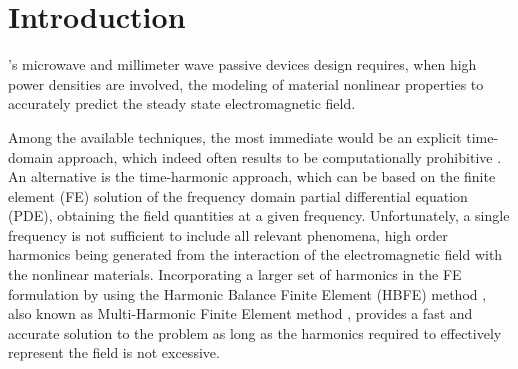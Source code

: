 \documentclass[journal]{IEEEtran}
\begin{document}
%
\IEEEpeerreviewmaketitle



\section{Introduction}
% 
% 
% 
% 
% 
's microwave and millimeter wave passive devices design
requires, when high power densities are involved, the modeling of material
nonlinear properties to accurately predict the steady state electromagnetic field.

Among the available techniques, the most immediate would be an explicit
time-domain approach, which indeed often results to be computationally
prohibitive \cite{deGersem2001}. An alternative is the time-harmonic approach,
which can be based on the finite element (FE) solution of the frequency domain
partial differential equation (PDE), obtaining the field quantities at a given
frequency. Unfortunately, a single frequency is not sufficient to include all
relevant phenomena, high order harmonics being generated from the interaction
of the electromagnetic field with the nonlinear materials. Incorporating a
larger set of harmonics in the FE formulation by using the Harmonic Balance
Finite Element (HBFE) method \cite{Yamada1988,Yamada1989}, also known as Multi-Harmonic Finite Element
method \cite{Copeland2010, Bachinger2005, Kolmbauer2009}, provides a fast and
accurate solution to the problem as long as the harmonics required to
effectively represent the field is not excessive. 
\end{document}
